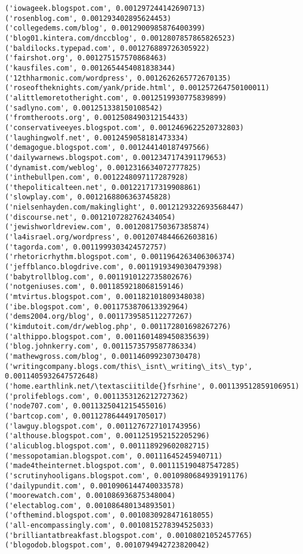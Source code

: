 \documentclass[11pt]{article}
\begin{document}
\begin{Verbatim}[commandchars=\\\{\}]
('iowageek.blogspot.com', 0.001297244142690713)
('rosenblog.com', 0.001293402895624453)
('collegedems.com/blog', 0.0012900985876400399)
('blog01.kintera.com/dnccblog', 0.0012807857865826523)
('baldilocks.typepad.com', 0.001276889726305922)
('fairshot.org', 0.001275157570868463)
('kausfiles.com', 0.0012654454081838344)
('12thharmonic.com/wordpress', 0.0012626265772670135)
('roseoftheknights.com/yank/pride.html', 0.001257264750100011)
('alittlemoretotheright.com', 0.0012519930775839899)
('sadlyno.com', 0.001251338150108542)
('fromtheroots.org', 0.0012508490312154433)
('conservativeeyes.blogspot.com', 0.0012469622520732803)
('laughingwolf.net', 0.0012459058181473334)
('demagogue.blogspot.com', 0.001244140187497566)
('dailywarnews.blogspot.com', 0.0012347174391179653)
('dynamist.com/weblog', 0.0012316634072777825)
('inthebullpen.com', 0.0012248097117287928)
('thepoliticalteen.net', 0.001221717319908861)
('slowplay.com', 0.0012168806363745828)
('nielsenhayden.com/makinglight', 0.0012129322693568447)
('discourse.net', 0.0012107282762434054)
('jewishworldreview.com', 0.0012081750367385874)
('la4israel.org/wordpress', 0.0012074844662603816)
('tagorda.com', 0.0011999303424572757)
('rhetoricrhythm.blogspot.com', 0.0011964263406306374)
('jeffblanco.blogdrive.com', 0.0011919349030479398)
('babytrollblog.com', 0.0011910122735802676)
('notgeniuses.com', 0.0011859218068159146)
('mtvirtus.blogspot.com', 0.001182101809348038)
('ibe.blogspot.com', 0.0011753870613392964)
('dems2004.org/blog', 0.0011739585112277267)
('kimdutoit.com/dr/weblog.php', 0.001172801698267276)
('althippo.blogspot.com', 0.0011601489450835639)
('blog.johnkerry.com', 0.0011573579587786334)
('mathewgross.com/blog', 0.001146099230730478)
('writingcompany.blogs.com/this\_isnt\_writing\_its\_typ', 0.0011405932647572648)
('home.earthlink.net/\textasciitilde{}fsrhine', 0.001139512859106951)
('prolifeblogs.com', 0.0011353126212727362)
('node707.com', 0.0011325041215455016)
('bartcop.com', 0.0011278644491705017)
('lawguy.blogspot.com', 0.0011276727101743956)
('althouse.blogspot.com', 0.0011251952152205296)
('alicublog.blogspot.com', 0.001118929602082715)
('messopotamian.blogspot.com', 0.00111645245940711)
('made4theinternet.blogspot.com', 0.001115190487547285)
('scrutinyhooligans.blogspot.com', 0.0010980684939191176)
('dailypundit.com', 0.0010906144740033578)
('moorewatch.com', 0.001086936875348004)
('electablog.com', 0.001086480134893501)
('ofthemind.blogspot.com', 0.0010830928471618055)
('all-encompassingly.com', 0.0010815278394525033)
('brilliantatbreakfast.blogspot.com', 0.00108021052457765)
('blogodob.blogspot.com', 0.0010794942723820042)

\end{Verbatim}
\end{document}
